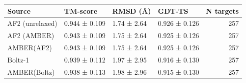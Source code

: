 \begin{tabular}{llllr}
\toprule
Source & TM-score & RMSD (Å) & GDT-TS & N targets \\
\midrule
AF2 (unrelaxed) & 0.944 ± 0.109 & 1.74 ± 2.64 & 0.926 ± 0.126 & 257 \\
AF2 (AMBER) & 0.943 ± 0.109 & 1.75 ± 2.64 & 0.925 ± 0.126 & 257 \\
AMBER(AF2) & 0.943 ± 0.109 & 1.75 ± 2.64 & 0.925 ± 0.126 & 257 \\
Boltz-1 & 0.939 ± 0.112 & 1.97 ± 2.95 & 0.916 ± 0.130 & 257 \\
AMBER(Boltz) & 0.938 ± 0.113 & 1.98 ± 2.96 & 0.915 ± 0.130 & 257 \\
\bottomrule
\end{tabular}
